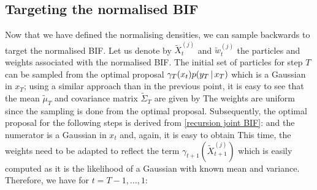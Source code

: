 \subsection{Targeting the normalised BIF}
Now that we have defined the normalising densities, we can sample backwards to target the normalised BIF. Let us denote by $\tilde X^{(j)}_{t}$ and $\tilde w^{(j)}_{t}$ the particles and weights associated with the normalised BIF. The initial set of particles for step $T$ can be sampled from the optimal proposal $\gamma_{T}(x_{t})p(y_{T}\,|\, x_{T})$ which is a Gaussian in $x_{T}$; using a similar approach than in the previous point, it is easy to see that the mean $\tilde \mu_{T}$ and covariance matrix $\tilde \Sigma_{T}$ are given by
%
The weights are uniform since the sampling is done from the optimal proposal. Subsequently, the optimal proposal for the following steps is derived from \eqref{recursion joint BIF}:
%
%
and the numerator is a Gaussian in $x_{t}$ and, again, it is easy to obtain
%
%
This time, the weights need to be adapted to reflect the term $\gamma_{t+1}(\tilde X^{(j)}_{t+1})$ which is easily computed as it is the likelihood of a Gaussian with known mean and variance. Therefore, we have for $t=T-1,\dots,1$:
%
%
